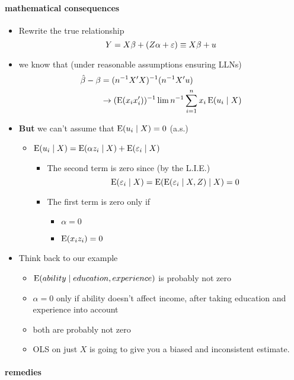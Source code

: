 \paragraph{mathematical consequences}
\begin{itemize}
\item Rewrite the true relationship
  \[ Y = X\beta + (Z\alpha + \varepsilon) \equiv X\beta + u \]
\item we know that (under reasonable assumptions ensuring LLNs)
  \begin{align*}
    \hat{\beta} - \beta
    &= (n^{-1} X'X)^{-1}(n^{-1} X'u) \\
    &\to (\operatorname{E}(x_{i}x_{i}'))^{-1} \lim n^{-1} \sum_{i=1}^{n} x_{i} \operatorname{E}(u_{i} \mid X)
  \end{align*}
\item \textbf{But} we can't assume that $\operatorname{E}(u_i \mid X) = 0$ (a.s.)
\begin{itemize}
\item $\operatorname{E}(u_{i} \mid X) = \operatorname{E}(\alpha z_{i} \mid X) + \operatorname{E}(\varepsilon_{i} \mid X)$
\begin{itemize}
\item The second term is zero since (by the L.I.E.)
  \[\operatorname{E}(\varepsilon_{i} \mid X) = \operatorname{E}(\operatorname{E}(\varepsilon_{i}\mid X, Z) \mid X) = 0\]
\item The first term is zero only if
\begin{itemize}
\item $\alpha = 0$
\item $\operatorname{E}(x_{i} z_{i}) = 0$
\end{itemize}
\end{itemize}
\end{itemize}
\item Think back to our example
\begin{itemize}
\item $\operatorname{E}(ability \mid education, experience)$ is probably not zero
\item $\alpha = 0$ only if ability doesn't affect income, after
           taking education and experience into account
\item both are probably not zero
\item OLS on just $X$ is going to give you a biased and
           inconsistent estimate.
\end{itemize}
\end{itemize}

\paragraph{remedies}

